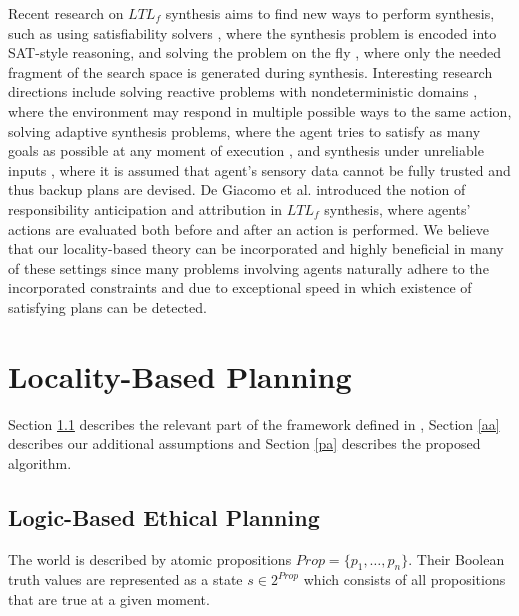 \documentclass[]{jair}
\begin{document}
Recent research on $LTL_f$ synthesis aims to find new ways to perform synthesis, such as using satisfiability solvers \cite{favorito2023DPLL, ciao2024synthesis}, where the synthesis problem is encoded into SAT-style reasoning, and solving the problem on the fly \cite{xiao2025fly}, where only the needed fragment of the search space is generated during synthesis. Interesting research directions include solving reactive problems with nondeterministic domains \cite{duret2025engineering}, where the environment may respond in multiple possible ways to the same action, solving adaptive synthesis problems, where the agent tries to satisfy as many goals as possible at any moment of execution \cite{giacomo2025}, and synthesis under unreliable inputs \cite{hagemeier2025}, where it is assumed that agent's sensory data cannot be fully trusted and thus backup plans are devised. De Giacomo et al. \cite{giacomoResp2025} introduced the notion of responsibility anticipation and attribution in $LTL_f$ synthesis, where agents' actions are evaluated both before and after an action is performed. We believe that our locality-based theory can be incorporated and highly beneficial in many of these settings since many problems involving agents naturally adhere to the incorporated constraints and due to exceptional speed in which existence of satisfying plans can be detected. %

\section{Locality-Based Planning}\label{lbp}

Section \ref{lbep} describes the relevant part of the framework defined in \cite{grandi2022logic}, Section \ref{aa} describes our additional assumptions and Section \ref{pa} describes the proposed algorithm.

\subsection{Logic-Based Ethical Planning}\label{lbep}

The world is described by atomic propositions $Prop=\{p_1, \dots, p_n\}$.
Their Boolean truth values are represented as a state $s\in 2^{Prop}$ which
consists of all propositions that are true at a given moment.
\end{document}
